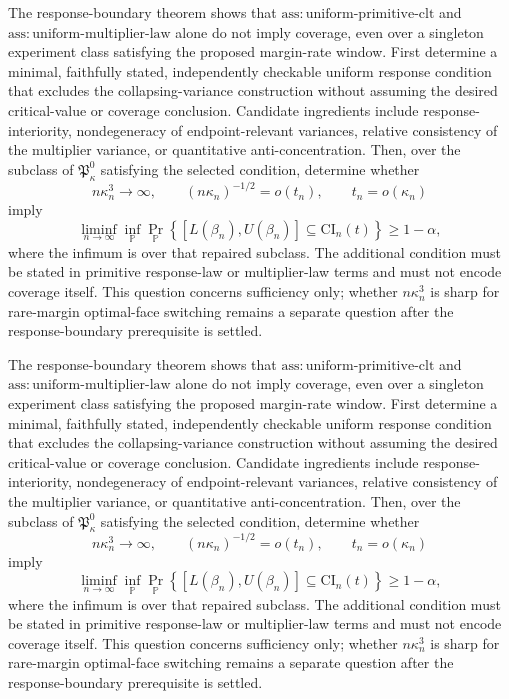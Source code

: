 The response-boundary theorem shows that \(\mathrm{ass:uniform\text{-}primitive\text{-}clt}\) and \(\mathrm{ass:uniform\text{-}multiplier\text{-}law}\) alone do not imply coverage, even over a singleton experiment class satisfying the proposed margin-rate window.  First determine a minimal, faithfully stated, independently checkable uniform response condition that excludes the collapsing-variance construction without assuming the desired critical-value or coverage conclusion.  Candidate ingredients include response-interiority, nondegeneracy of endpoint-relevant variances, relative consistency of the multiplier variance, or quantitative anti-concentration.  Then, over the subclass of \(\mathfrak P_{\kappa}^{0}\) satisfying the selected condition, determine whether
\[
n\kappa_n^3\to\infty,
\qquad
(n\kappa_n)^{-1/2}=o(t_n),
\qquad
t_n=o(\kappa_n)
\]
imply
\[
\liminf_{n\to\infty}\inf_{\mathbb P}
\Pr_{\mathbb P}\!\left\{
[L(\beta_n),U(\beta_n)]\subseteq\mathrm{CI}_n(t)
\right\}\geq1-\alpha,
\]
where the infimum is over that repaired subclass.  The additional condition must be stated in primitive response-law or multiplier-law terms and must not encode coverage itself.  This question concerns sufficiency only; whether \(n\kappa_n^3\) is sharp for rare-margin optimal-face switching remains a separate question after the response-boundary prerequisite is settled.

The response-boundary theorem shows that \(\mathrm{ass:uniform\text{-}primitive\text{-}clt}\) and \(\mathrm{ass:uniform\text{-}multiplier\text{-}law}\) alone do not imply coverage, even over a singleton experiment class satisfying the proposed margin-rate window.  First determine a minimal, faithfully stated, independently checkable uniform response condition that excludes the collapsing-variance construction without assuming the desired critical-value or coverage conclusion.  Candidate ingredients include response-interiority, nondegeneracy of endpoint-relevant variances, relative consistency of the multiplier variance, or quantitative anti-concentration.  Then, over the subclass of \(\mathfrak P_{\kappa}^{0}\) satisfying the selected condition, determine whether
\[
n\kappa_n^3\to\infty,
\qquad
(n\kappa_n)^{-1/2}=o(t_n),
\qquad
t_n=o(\kappa_n)
\]
imply
\[
\liminf_{n\to\infty}\inf_{\mathbb P}
\Pr_{\mathbb P}\!\left\{
[L(\beta_n),U(\beta_n)]\subseteq\mathrm{CI}_n(t)
\right\}\geq1-\alpha,
\]
where the infimum is over that repaired subclass.  The additional condition must be stated in primitive response-law or multiplier-law terms and must not encode coverage itself.  This question concerns sufficiency only; whether \(n\kappa_n^3\) is sharp for rare-margin optimal-face switching remains a separate question after the response-boundary prerequisite is settled.

